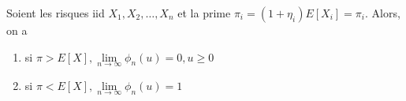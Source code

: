 \begin{proposition}{}{}
	Soient les risques iid $X_1, X_2, \dots, X_n$ et la prime $\pi_i = (1 + \eta_i)E[X_i] = \pi_i$. Alors, on a 
	\begin{enumerate}
		\item si $\pi > E[X], \lim\limits_{n \to \infty}\phi_n(u) = 0, u\geq 0$
		\item si $\pi < E[X], \lim\limits_{n \to \infty}\phi_n(u) = 1$
	\end{enumerate}
\end{proposition}












